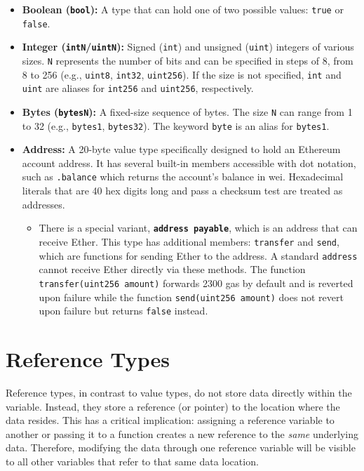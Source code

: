 \documentclass{scrbook}
\begin{document}
\begin{itemize}
    \item \textbf{Boolean (}\texttt{\textbf{bool}}\textbf{):} A type that can hold one of two possible values: \texttt{true} or \texttt{false}.
    
    \item \textbf{Integer (}\texttt{\textbf{intN}}\textbf{/}\texttt{\textbf{uintN}}\textbf{):} Signed (\texttt{int}) and unsigned (\texttt{uint}) integers of various sizes. \texttt{N} represents the number of bits and can be specified in steps of 8, from 8 to 256 (e.g., \texttt{uint8}, \texttt{int32}, \texttt{uint256}). If the size is not specified, \texttt{int} and \texttt{uint} are aliases for \texttt{int256} and \texttt{uint256}, respectively.
    
    \item \textbf{Bytes (}\texttt{\textbf{bytesN}}\textbf{):} A fixed-size sequence of bytes. The size \texttt{N} can range from 1 to 32 (e.g., \texttt{bytes1}, \texttt{bytes32}). The keyword \texttt{byte} is an alias for \texttt{bytes1}.
    
    \item \textbf{Address:} A 20-byte value type specifically designed to hold an Ethereum account address. It has several built-in members accessible with dot notation, such as \texttt{.balance} which returns the account's balance in wei. Hexadecimal literals that are 40 hex digits long and pass a checksum test are treated as addresses.
    \begin{itemize}
        \item There is a special variant, \texttt{\textbf{address payable}}, which is an address that can receive Ether. This type has additional members: \texttt{transfer} and \texttt{send}, which are functions for sending Ether to the address. A standard \texttt{address} cannot receive Ether directly via these methods.
        The function \texttt{transfer(uint256 amount)} forwards 2300 gas by default and is reverted upon failure while the function \texttt{send(uint256 amount)} does not revert upon failure but returns \texttt{false} instead.
    \end{itemize}
\end{itemize}

\section{Reference Types}

Reference types, in contrast to value types, do not store data directly within the variable. Instead, they store a reference (or pointer) to the location where the data resides. This has a critical implication: assigning a reference variable to another or passing it to a function creates a new reference to the \textit{same} underlying data. Therefore, modifying the data through one reference variable will be visible to all other variables that refer to that same data location.\\
\end{document}
